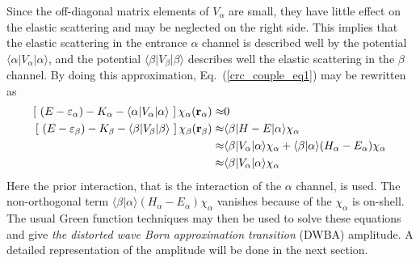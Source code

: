 \documentclass[
12pt, %
oneside, %
english, %
onehalfspacing, %
onehalfspacing, %
headsepline, %
]{MastersDoctoralThesis} %
\begin{document}
Since the off-diagonal matrix elements of $V_\alpha$ are small, they have little effect on the elastic scattering and may be neglected on the right side. 
This implies that the elastic scattering in the entrance $\alpha$ channel is described well by the potential $\langle \alpha \vert V_\alpha \vert \alpha \rangle$, and the potential $\langle \beta \vert V_\beta \vert \beta \rangle$ describes well the elastic scattering in the $\beta$ channel.
By doing this approximation, Eq.~(\ref{crc_couple_eq1}) may be rewritten as
\begin{align}
\left[ ~\left(E-\varepsilon_\alpha \right)  -K_\alpha -
\langle \alpha \vert V_\alpha \vert \alpha \rangle ~\right] 
\chi_\alpha ({\bf r}_\alpha) \approx & 0
 \nonumber \\
\left[ ~\left(E-\varepsilon_\beta \right)  -K_\beta -
\langle \beta \vert V_\beta \vert \beta \rangle ~\right] 
\chi_\beta ({\bf r}_\beta) \approx &
\langle \beta \vert H-E \vert \alpha \rangle \chi_\alpha
\nonumber \\
\approx &
\langle \beta \vert V_\alpha \vert  \alpha \rangle \chi_\alpha + \langle \beta \vert \alpha \rangle (H_\alpha - E_\alpha) \chi_\alpha 
\nonumber \\
\approx & \langle \beta \vert V_\alpha \vert  \alpha \rangle \chi_\alpha
\label{crc_couple_eq2}
\end{align}
 Here the prior interaction, that is the interaction of the $\alpha$ channel, is used. The non-orthogonal term $\langle \beta \vert \alpha \rangle (H_\alpha - E_\alpha) \chi_\alpha$ vanishes because of the $\chi_\alpha$ is on-shell. The usual Green function techniques may then be used to solve these equations and give \textit{the  distorted wave Born approximation transition} (DWBA) amplitude. A detailed representation of the amplitude will be done in the next section. 
\end{document}
